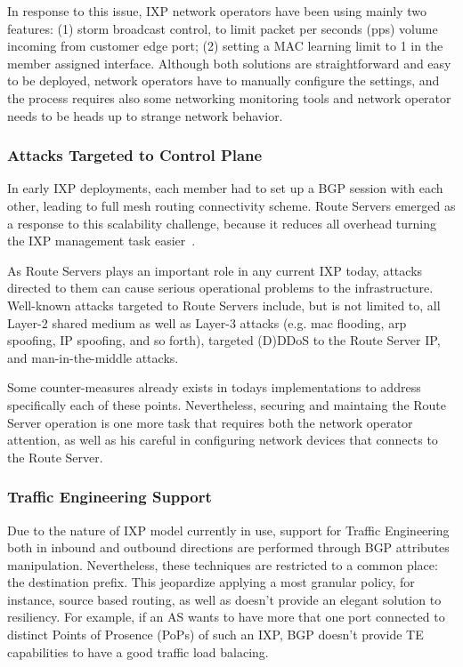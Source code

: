In response to this issue, IXP network operators have been using mainly two features: (1) storm broadcast control, to limit packet per seconds (pps) volume incoming from customer edge port; (2) setting a MAC learning limit to 1 in the member assigned interface. Although both solutions are straightforward and easy to be deployed, network operators have to manually configure the settings, and the process requires also some networking monitoring tools and network operator needs to be heads up to strange network behavior.

\subsubsection{Attacks Targeted to Control Plane}
In early IXP deployments, each member had to set up a BGP session with each other, leading to full mesh routing connectivity scheme. Route Servers emerged as a response to this scalability challenge, because it reduces all overhead turning the IXP management task easier~\cite{lu2005networking}.

As Route Servers plays an important role in any current IXP today, attacks directed to them can cause serious operational problems to the infrastructure. Well-known attacks targeted to Route Servers include, but is not limited to, all Layer-2 shared medium as well as Layer-3 attacks (e.g. mac flooding, arp spoofing, IP spoofing, and so forth), targeted (D)DDoS to the Route Server IP, and man-in-the-middle attacks.

Some counter-measures already exists in todays implementations to address specifically each of these points. Nevertheless, securing and maintaing the Route Server operation is one more task that requires both the network operator attention, as well as his careful in configuring network devices that connects to the Route Server.

\subsubsection{Traffic Engineering Support}
Due to the nature of IXP model currently in use, support for Traffic Engineering both in inbound and outbound directions are performed through BGP attributes manipulation. Nevertheless, these techniques are restricted to a common place: the destination prefix. This jeopardize applying a most granular policy, for instance, source based routing, as well as doesn't provide an elegant solution to resiliency. For example, if an AS wants to have more that one port connected to distinct Points of Prosence (PoPs) of such an IXP, BGP doesn't provide TE capabilities to have a good traffic load balacing.

